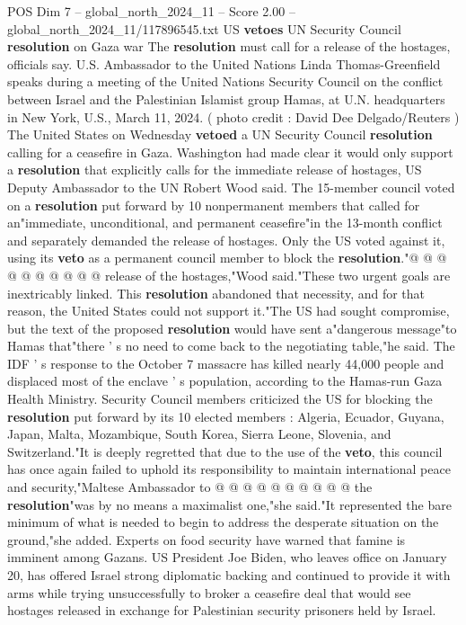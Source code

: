 \begin{textsample}{POS Dim 7 – global\_north\_2024\_11 – Score 2.00 – global\_north\_2024\_11/117896545.txt}  \label{ex:f7_pos_195}
US \textbf{vetoes} UN Security Council \textbf{resolution} on Gaza war The \textbf{resolution} must call for a release of the hostages, officials say.
U.S.
Ambassador to the United Nations Linda Thomas-Greenfield speaks during a meeting of the United Nations Security Council on the conflict between Israel and the Palestinian Islamist group Hamas, at U.N. headquarters in New York, U.S., March 11, 2024. ( photo credit : David Dee Delgado/Reuters ) The United States on Wednesday \textbf{vetoed} a UN Security Council \textbf{resolution} calling for a ceasefire in Gaza.
Washington had made clear it would only support a \textbf{resolution} that explicitly calls for the immediate release of hostages, US Deputy Ambassador to the UN Robert Wood said.
The 15-member council voted on a \textbf{resolution} put forward by 10 nonpermanent members that called for an"immediate, unconditional, and permanent ceasefire"in the 13-month conflict and separately demanded the release of hostages.
Only the US voted against it, using its \textbf{veto} as a permanent council member to block the \textbf{resolution}."@ @ @ @ @ @ @ @ @ @ release of the hostages,"Wood said."These two urgent goals are inextricably linked.
This \textbf{resolution} abandoned that necessity, and for that reason, the United States could not support it."The US had sought compromise, but the text of the proposed \textbf{resolution} would have sent a"dangerous message"to Hamas that"there ' s no need to come back to the negotiating table,"he said.
The IDF ' s response to the October 7 massacre has killed nearly 44,000 people and displaced most of the enclave ' s population, according to the Hamas-run Gaza Health Ministry.
Security Council members criticized the US for blocking the \textbf{resolution} put forward by its 10 elected members : Algeria, Ecuador, Guyana, Japan, Malta, Mozambique, South Korea, Sierra Leone, Slovenia, and Switzerland."It is deeply regretted that due to the use of the \textbf{veto}, this council has once again failed to uphold its responsibility to maintain international peace and security,"Maltese Ambassador to @ @ @ @ @ @ @ @ @ @ the \textbf{resolution}"was by no means a maximalist one,"she said."It represented the bare minimum of what is needed to begin to address the desperate situation on the ground,"she added.
Experts on food security have warned that famine is imminent among Gazans.
US President Joe Biden, who leaves office on January 20, has offered Israel strong diplomatic backing and continued to provide it with arms while trying unsuccessfully to broker a ceasefire deal that would see hostages released in exchange for Palestinian security prisoners held by Israel.

\end{textsample}
